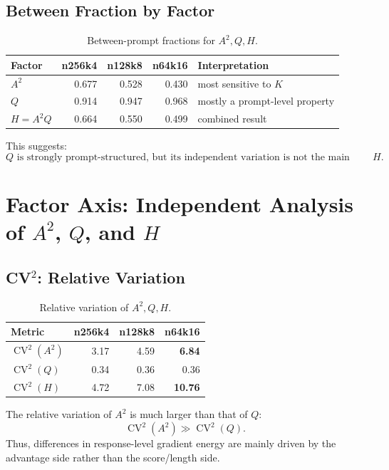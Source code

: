 \documentclass[11pt,a4paper]{article}
\newcommand{\CV}{\operatorname{CV}}
\begin{document}
\subsection{Between Fraction by Factor}

\begin{table}[h]
\centering
\begin{tabular}{lrrrl}
\toprule
Factor & n256k4 & n128k8 & n64k16 & Interpretation\\
\midrule
\(A^2\) & 0.677 & 0.528 & 0.430 & most sensitive to \(K\)\\
\(Q\) & 0.914 & 0.947 & 0.968 & mostly a prompt-level property\\
\(H=A^2Q\) & 0.664 & 0.550 & 0.499 & combined result\\
\bottomrule
\end{tabular}
\caption{Between-prompt fractions for \(A^2,Q,H\).}
\end{table}

This suggests:
\[
\boxed{
Q \text{ is strongly prompt-structured, but its independent variation is not the main driver of } H.
}
\]

\section{Factor Axis: Independent Analysis of \(A^2\), \(Q\), and \(H\)}

\subsection{CV\(^2\): Relative Variation}

\begin{table}[h]
\centering
\begin{tabular}{lrrr}
\toprule
Metric & n256k4 & n128k8 & n64k16\\
\midrule
\(\CV^2(A^2)\) & 3.17 & 4.59 & \textbf{6.84}\\
\(\CV^2(Q)\) & 0.34 & 0.36 & 0.36\\
\(\CV^2(H)\) & 4.72 & 7.08 & \textbf{10.76}\\
\bottomrule
\end{tabular}
\caption{Relative variation of \(A^2,Q,H\).}
\end{table}

The relative variation of \(A^2\) is much larger than that of \(Q\):
\[
\CV^2(A^2)\gg \CV^2(Q).
\]
Thus, differences in response-level gradient energy are mainly driven by the advantage side rather than the score/length side.
\end{document}
